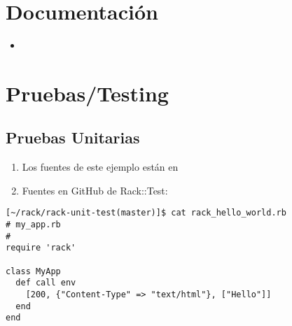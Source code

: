 \section{Documentación}

\begin{itemize}
\item
{}
\end{itemize}

\section{Pruebas/Testing}

\subsection{Pruebas Unitarias}
\label{subsectionpruebasunitarias}

\begin{enumerate}
\item 
Los fuentes de este ejemplo están en
\item 
Fuentes en GitHub de Rack::Test:
\end{enumerate}

\begin{verbatim}
[~/rack/rack-unit-test(master)]$ cat rack_hello_world.rb 
# my_app.rb
#
require 'rack'

class MyApp
  def call env
    [200, {"Content-Type" => "text/html"}, ["Hello"]] 
  end
end
\end{verbatim}

